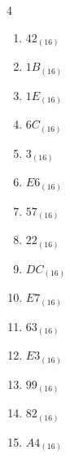 \begin{multicols}{4}
\begin{enumerate}
        \phantom{$=106$}

  \item $42_{(16)}$

        \phantom{$=66$}

  \item $1B_{(16)}$

        \phantom{$=27$}

  \item $1E_{(16)}$

        \phantom{$=30$}

\columnbreak %

  \item $6C_{(16)}$

        \phantom{$=108$}

  \item $3_{(16)}$

        \phantom{$=3$}

  \item $E6_{(16)}$

        \phantom{$=230$}

  \item $57_{(16)}$

        \phantom{$=87$}

  \item $22_{(16)}$

        \phantom{$=34$}

  \item $DC_{(16)}$

        \phantom{$=220$}

  \item $E7_{(16)}$

        \phantom{$=231$}

  \item $63_{(16)}$

        \phantom{$=99$}

  \item $E3_{(16)}$

        \phantom{$=227$}

  \item $99_{(16)}$

        \phantom{$=153$}

  \item $82_{(16)}$

        \phantom{$=130$}

  \item $A4_{(16)}$

        \phantom{$=164$}


\end{enumerate}
\end{multicols}
